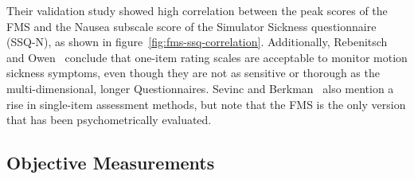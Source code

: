 Their validation study showed high correlation between the peak scores of the FMS and the Nausea subscale score of
the Simulator Sickness questionnaire (SSQ-N), as shown in figure~\ref{fig:fms-ssq-correlation}.
Additionally, Rebenitsch and Owen~\cite{Rebenitsch2016} conclude that one-item rating scales are acceptable to
monitor motion sickness symptoms, even though they are not as sensitive or thorough as the multi-dimensional, longer
Questionnaires.
Sevinc and Berkman~\cite{Sevinc2020} also mention a rise in single-item assessment methods, but note that the FMS is
the only version that has been psychometrically evaluated.


\subsection{Objective Measurements}\label{subsec:objective-measurements}

